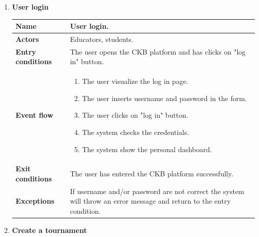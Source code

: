 \begin{enumerate}[label=\textbf{UC.\arabic*}]
\begin{table}[H]
\begin{tabular}{|m{3.2cm}|m{9.8cm}|}
\begin{itemize}
                    \end{itemize} \\
                    \hline 
                \end{tabular}
        \end{table}
        \item {} \textbf{User login}
        \begin{table}[H]
    	    \centering
                \renewcommand{\arraystretch}{1.5}
                \begin{tabular}{|m{3.2cm}|m{9.8cm}|}
                    \hline
                    \textbf{Name} & User login.\\
                    \hline
                    \textbf{Actors} &  Educators, students. \\
                    \hline
                    \textbf{Entry conditions}  & The user opens the CKB platform and has clicks on "log in" button. \\
                    \hline
                    \textbf{Event flow}  & 
                    \begin{enumerate}[label=\arabic*.]
                        \item The user visualize the log in page.
                        \item The user inserts username and password in the form.
                        \item The user clicks on "log in" button.
                        \item The system checks the credentials.
                        \item The system show the personal dashboard.
                    \end{enumerate}\\
                    \hline
                    \textbf{Exit conditions}  & The user has entered the CKB platform successfully. \\
                    \hline
                    \textbf{Exceptions}  & If username and/or password are not correct the system will throw an error message and return to the entry condition. \\
                    \hline 
                \end{tabular}
        \end{table}
        \item {} \textbf{Create a tournament}
        \begin{table}[H]
    	    \centering

\end{table}
\end{enumerate}
